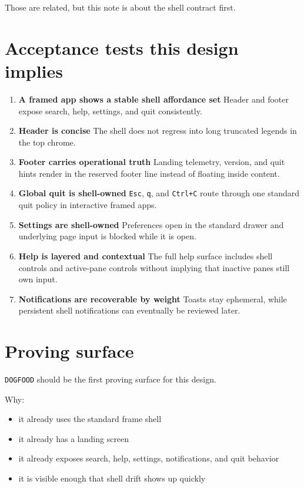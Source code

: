 Those are related, but this note is about the shell contract first.

\section{Acceptance tests this design implies}\label{record-047-acceptance-tests-this-design-implies}

\begin{enumerate}
\def\labelenumi{\arabic{enumi}.}
\item
  \textbf{A framed app shows a stable shell affordance set} Header and footer expose search, help, settings, and quit consistently.
\item
  \textbf{Header is concise} The shell does not regress into long truncated legends in the top chrome.
\item
  \textbf{Footer carries operational truth} Landing telemetry, version, and quit hints render in the reserved footer line instead of floating inside content.
\item
  \textbf{Global quit is shell-owned} \texttt{E\allowbreak{}s\allowbreak{}c}, \texttt{q}, and \texttt{C\allowbreak{}t\allowbreak{}r\allowbreak{}l\allowbreak{}+\allowbreak{}C} route through one standard quit policy in interactive framed apps.
\item
  \textbf{Settings are shell-owned} Preferences open in the standard drawer and underlying page input is blocked while it is open.
\item
  \textbf{Help is layered and contextual} The full help surface includes shell controls and active-pane controls without implying that inactive panes still own input.
\item
  \textbf{Notifications are recoverable by weight} Toasts stay ephemeral, while persistent shell notifications can eventually be reviewed later.
\end{enumerate}

\section{Proving surface}\label{record-047-proving-surface}

\texttt{D\allowbreak{}O\allowbreak{}G\allowbreak{}F\allowbreak{}O\allowbreak{}O\allowbreak{}D} should be the first proving surface for this design.

Why:

\begin{itemize}
\tightlist
\item
  it already uses the standard frame shell
\item
  it already has a landing screen
\item
  it already exposes search, help, settings, notifications, and quit behavior
\item
  it is visible enough that shell drift shows up quickly
\end{itemize}

